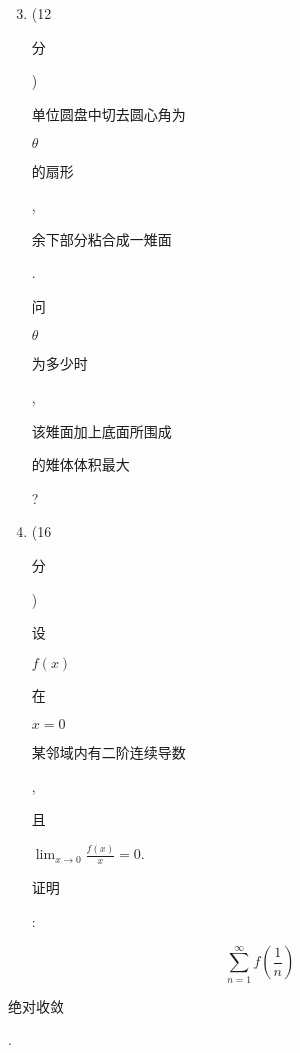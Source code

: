 \documentclass[10pt]{article}
\begin{document}
\begin{enumerate}
  \setcounter{enumi}{2}
  \item (12 \begin{CJK}{UTF8}{mj}分\end{CJK}) \begin{CJK}{UTF8}{mj}单位圆盘中切去圆心角为\end{CJK} $\theta$ \begin{CJK}{UTF8}{mj}的扇形\end{CJK}, \begin{CJK}{UTF8}{mj}余下部分粘合成一雉面\end{CJK}. \begin{CJK}{UTF8}{mj}问\end{CJK} $\theta$ \begin{CJK}{UTF8}{mj}为多少时\end{CJK}, \begin{CJK}{UTF8}{mj}该雉面加上底面所围成\end{CJK} \begin{CJK}{UTF8}{mj}的雉体体积最大\end{CJK}?

  \item (16 \begin{CJK}{UTF8}{mj}分\end{CJK}) \begin{CJK}{UTF8}{mj}设\end{CJK} $f(x)$ \begin{CJK}{UTF8}{mj}在\end{CJK} $x=0$ \begin{CJK}{UTF8}{mj}某邻域内有二阶连续导数\end{CJK}, \begin{CJK}{UTF8}{mj}且\end{CJK} $\lim _{x \rightarrow 0} \frac{f(x)}{x}=0$. \begin{CJK}{UTF8}{mj}证明\end{CJK}:

\end{enumerate}
$$
\sum_{n=1}^{\infty} f\left(\frac{1}{n}\right)
$$
\begin{CJK}{UTF8}{mj}绝对收敛\end{CJK}.
\end{document}
